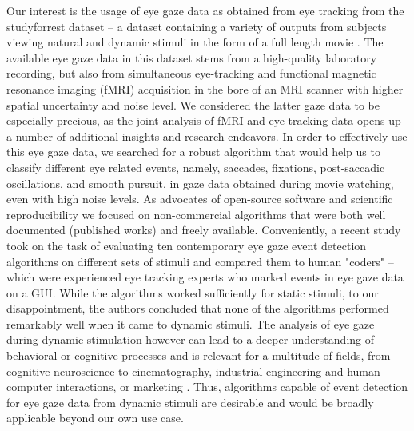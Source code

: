 Our interest is the usage of eye gaze data as obtained from eye tracking from the studyforrest dataset -- a dataset containing a variety of outputs from subjects viewing natural and dynamic stimuli in the form of a full length movie \citep{Hanke2016}. The available eye gaze data in this dataset stems from a high-quality laboratory recording, but also from simultaneous eye-tracking and functional magnetic resonance imaging (fMRI) acquisition in the bore of an MRI scanner with higher spatial uncertainty and noise level. We considered the latter gaze data to be especially precious, as the joint analysis of fMRI and eye tracking data opens up a number of additional insights and research endeavors.  In order to effectively use this eye gaze data, we searched for a robust algorithm that would help us to classify different eye related events, namely, saccades, fixations, post-saccadic oscillations, and smooth pursuit, in gaze data obtained during movie watching, even with high noise levels. As advocates of open-source software and scientific reproducibility we focused on non-commercial algorithms that were both well documented (published works) and freely available. Conveniently, a recent study \citep{Andersson2017} took on the task of evaluating ten contemporary eye gaze event detection algorithms on different sets of stimuli and compared them to human "coders" -- which were experienced eye tracking experts who marked events in eye gaze data on a GUI. While the algorithms worked sufficiently for static stimuli, to our disappointment, the authors concluded that none of the algorithms performed remarkably well when it came to dynamic stimuli. The analysis of eye gaze during dynamic stimulation however can lead to a deeper understanding of behavioral or cognitive processes and is relevant for a multitude of fields, from cognitive neuroscience to cinematography, industrial engineering and human-computer interactions, or marketing \citep{Duchowski2002}. Thus, algorithms capable of event detection for eye gaze data from dynamic stimuli are desirable and would be broadly applicable beyond our own use case. \\

